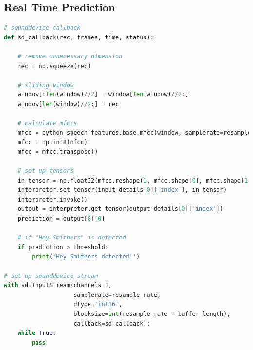 \documentclass[conference]{IEEEtran}
\begin{document}
\subsection{Real Time Prediction} \label{appendix:realtime}
\begin{lstlisting}[language=Python]
# sounddevice callback
def sd_callback(rec, frames, time, status):

    # remove unnecessary dimension
    rec = np.squeeze(rec)

    # sliding window
    window[:len(window)//2] = window[len(window)//2:]
    window[len(window)//2:] = rec

    # calculate mfccs
    mfcc = python_speech_features.base.mfcc(window, samplerate=resample_rate, winstep=0.025, numcep=13, winfunc=np.hanning)
    mfcc = np.int8(mfcc)
    mfcc = mfcc.transpose()

    # set up tensors
    in_tensor = np.float32(mfcc.reshape(1, mfcc.shape[0], mfcc.shape[1], 1))
    interpreter.set_tensor(input_details[0]['index'], in_tensor)
    interpreter.invoke()
    output = interpreter.get_tensor(output_details[0]['index'])
    prediction = output[0][0]

    # if "Hey Smithers" is detected
    if prediction > threshold:
        print('Hey Smithers detected!')

# set up sounddevice stream
with sd.InputStream(channels=1,
                    samplerate=resample_rate,
                    dtype='int16',
                    blocksize=int(resample_rate * buffer_length),
                    callback=sd_callback):
    while True:
        pass
\end{lstlisting}
\end{document}
